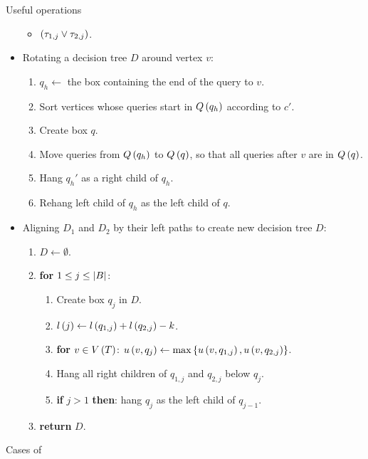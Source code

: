 \begin{frame}[allowframebreaks]{Useful operations}
\begin{itemize}
\begin{itemize}
        \item$\left( \tau_{1,j}\lor \tau_{2,j} \right)$.
    \end{itemize} 
    \framebreak
    \item Rotating a decision tree $D$ around vertex $v$: 
    \begin{enumerate}
        \item $q_h\gets $ the box containing the end of the query to $v$.
        \item Sort vertices whose queries start in $Q\left( q_h \right)$ according to $c'$.
        \item Create box $q$.
        \item Move queries from $Q\left( q_h \right)$ to $Q\left( q \right)$, so that all queries after $v$ are in $Q\left( q \right)$.
        \item Hang $q_h'$ as a right child of $q_h$.
        \item Rehang left child of $q_h$ as the left child of $q$. 
    \end{enumerate}
    \framebreak
    \item Aligning $D_1$ and $D_2$ by their left paths to create new decision tree $D$: 
    \begin{enumerate}
        \item $D\gets\emptyset$.
        \item \textbf{for} $1\leq j\leq \left| B \right|$:
        \begin{enumerate}
            \item Create box $q_j$ in $D$.
            \item $l\left( j \right)\gets l\left( q_{1,j} \right)+ l\left( q_{2,j} \right)-k$.
            \item \textbf{for} $v\in V\left( T \right)$: $u\left( v, q_j \right)\gets \max\left\{ u\left( v, q_{1,j} \right),u\left( v, q_{2,j} \right) \right\}$.
            \item Hang all right children of $q_{1,j}$ and $q_{2,j}$ below $q_j$.
            \item \textbf{if} $j>1$ \textbf{then}: hang $q_j$ as the left child of $q_{j-1}$.
        \end{enumerate}
        \item \textbf{return} $D$.
    \end{enumerate}
\end{itemize}
\end{frame}
\begin{frame}{Cases of \FDP}

\end{frame}
